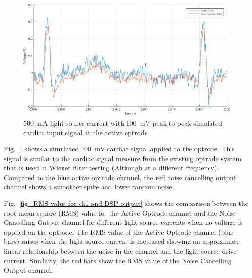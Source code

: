 \begin{landscape}\centering
\begin{figure}[h]
\centerline{\includegraphics[width=\linewidth]{5-Experiment/SimCardiac.pdf}}
\caption{\qty{500}{\mA} light source current with \qty{100}{\mV} peak to peak simulated cardiac input signal at the active optrode}
\label{fig_SimCardiac}
\end{figure}
\end{landscape}

Fig.~\ref{fig_SimCardiac} shows a simulated \qty{100}{mV} cardiac signal applied to the optrode.  This signal is similar to the cardiac signal measure from the existing optrode system that is used in Wiener filter testing (Although at a different frequency).  Compared to the blue active optrode channel, the red noise cancelling output channel shows a smoother spike and lower random noise.  

Fig.~\ref{fig_RMS value for ch1 and DSP output} shows the comparison between the root mean square (RMS) value for the Active Optrode channel and the Noise Cancelling Output channel for different light source currents when no voltage is applied on the optrode.  The RMS value of the Active Optrode channel (blue bars) raises when the light source current is increased showing an approximate linear relationship between the noise in the channel and the light source drive current. Similarly, the red bars show the RMS value of the Noise Cancelling Output channel. 

